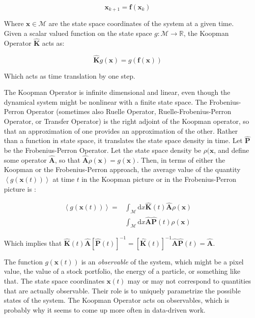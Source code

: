 \begin{equation}
\mathbf{x}_{k+1} = \mathbf{f}(\mathbf{x}_{k})
\end{equation}

Where $\mathbf{x}\in\mathscr{M}$ are the state space coordinates of the system at a given time. Given a scalar valued function on the state space $g:\mathscr{M} \rightarrow \mathbb{R}$, the Koopman Operator $\mathbf{\hat{K}}$ acts as:

\begin{equation}
\mathbf{\hat{K}}g(\mathbf{x}) = g(\mathbf{f}(\mathbf{x}))
\end{equation} 

Which acts as time translation by one step.

The Koopman Operator is infinite dimensional and linear, even though the dynamical system might be nonlinear with a finite state space. The Frobenius-Perron Operator (sometimes also Ruelle Operator, Ruelle-Frobenius-Perron Operator, or Transfer Operator) is the right adjoint of the Koopman operator, so that an approximation of one provides an approximation of the other. Rather than a function in state space, it translates the state space density in time. Let $\mathbf{\hat{P}}$ be the Frobenius-Perron Operator. Let the state space density be $\rho(\mathbf{x}$, and define some operator $\mathbf{\hat{A}}$, so that $\mathbf{\hat{A}}\rho(\mathbf{x}) = g(\mathbf{x})$. Then, in terms of either the Koopman or the Frobenius-Perron approach, the average value of the quantity $\left< g(\mathbf{x}(t))\right>$ at time $t$ in the Koopman picture or in the Frobenius-Perron picture is \cite{cvitanovic2016chaos,salova2019koopman}:

\begin{equation}
\begin{array}{rl}
\left< g(\mathbf{x}(t))\right> =& \int_\mathscr{M} \mathrm{d}x \mathbf{\hat{K}}(t)\mathbf{\hat{A}}\rho(\mathbf{x}) \\
& \int_\mathscr{M} \mathrm{d}x \mathbf{\hat{A}}\mathbf{\hat{P}}(t)\rho(\mathbf{x})
\end{array}
\end{equation}

Which implies that $\mathbf{\hat{K}}(t)\mathbf{\hat{A}} \left[\mathbf{\hat{P}}(t)\right]^{-1} = \left[\mathbf{\hat{K}}(t) \right]^{-1} \mathbf{\hat{A}} \mathbf{\hat{P}}(t) = \mathbf{\hat{A}}$.


The function $g(\mathbf{x}(t))$ is an \textit{observable} of the system, which might be a pixel value, the value of a stock portfolio, the energy of a particle, or something like that. The state space coordinates $\mathbf{x}(t)$ may or may not correspond to quantities that are actually observable. Their role is to uniquely parametrize the possible states of the system. The Koopman Operator acts on observables, which is probably why it seems to come up more often in data-driven work. 


